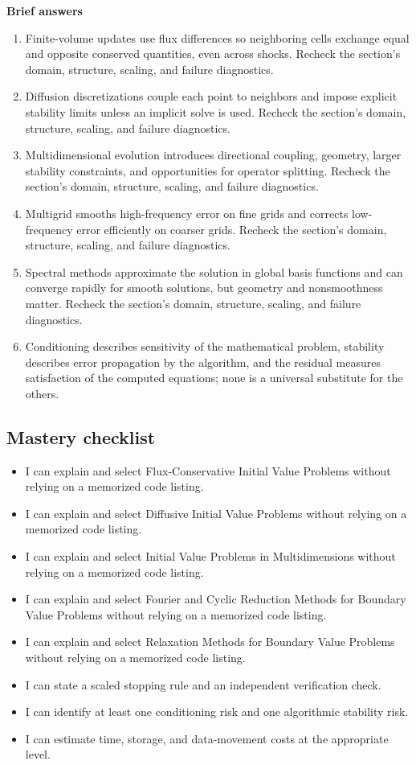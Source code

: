 \documentclass[10pt,letterpaper]{article}
\begin{document}
\textbf{Brief answers}
\begin{enumerate}
\item Finite-volume updates use flux differences so neighboring cells exchange equal and opposite conserved quantities, even across shocks. Recheck the section's domain, structure, scaling, and failure diagnostics.
\item Diffusion discretizations couple each point to neighbors and impose explicit stability limits unless an implicit solve is used. Recheck the section's domain, structure, scaling, and failure diagnostics.
\item Multidimensional evolution introduces directional coupling, geometry, larger stability constraints, and opportunities for operator splitting. Recheck the section's domain, structure, scaling, and failure diagnostics.
\item Multigrid smooths high-frequency error on fine grids and corrects low-frequency error efficiently on coarser grids. Recheck the section's domain, structure, scaling, and failure diagnostics.
\item Spectral methods approximate the solution in global basis functions and can converge rapidly for smooth solutions, but geometry and nonsmoothness matter. Recheck the section's domain, structure, scaling, and failure diagnostics.
\item Conditioning describes sensitivity of the mathematical problem, stability describes error propagation by the algorithm, and the residual measures satisfaction of the computed equations; none is a universal substitute for the others.
\end{enumerate}

\subsection*{Mastery checklist}
\begin{itemize}
\item[$\square$] I can explain and select Flux-Conservative Initial Value Problems without relying on a memorized code listing.
\item[$\square$] I can explain and select Diffusive Initial Value Problems without relying on a memorized code listing.
\item[$\square$] I can explain and select Initial Value Problems in Multidimensions without relying on a memorized code listing.
\item[$\square$] I can explain and select Fourier and Cyclic Reduction Methods for Boundary Value Problems without relying on a memorized code listing.
\item[$\square$] I can explain and select Relaxation Methods for Boundary Value Problems without relying on a memorized code listing.
\item[$\square$] I can state a scaled stopping rule and an independent verification check.
\item[$\square$] I can identify at least one conditioning risk and one algorithmic stability risk.
\item[$\square$] I can estimate time, storage, and data-movement costs at the appropriate level.
\end{itemize}
\end{document}
